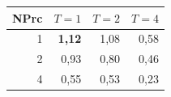 \begin{tabular}{@{}rrrr@{}}
\toprule
NPrc & $T=1$ & $T=2$ & $T=4$ \\
\midrule
1 & \textbf{1{,}12} & 1{,}08 & 0{,}58 \\
2 & 0{,}93 & 0{,}80 & 0{,}46 \\
4 & 0{,}55 & 0{,}53 & 0{,}23 \\
\bottomrule
\end{tabular}

